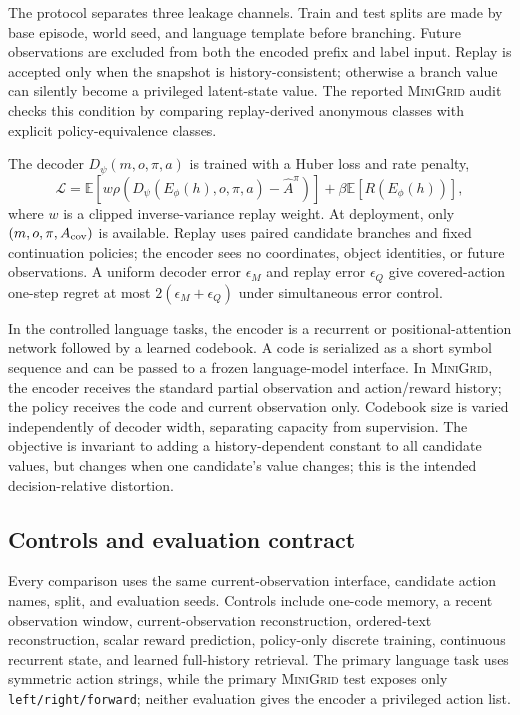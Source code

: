 \documentclass{article}
\def\minigrid{\textsc{MiniGrid}}
\begin{document}
The protocol separates three leakage channels. Train and test splits are made by base episode, world seed, and language template before branching. Future observations are excluded from both the encoded prefix and label input. Replay is accepted only when the snapshot is history-consistent; otherwise a branch value can silently become a privileged latent-state value. The reported \minigrid{} audit checks this condition by comparing replay-derived anonymous classes with explicit policy-equivalence classes.

The decoder $D_\psi(m,o,\pi,a)$ is trained with a Huber loss and rate penalty,
\begin{equation}
\mathcal L=\mathbb E\left[w\rho(D_\psi(E_\phi(h),o,\pi,a)-\widehat A^\pi)\right]+\beta\mathbb E[R(E_\phi(h))],
\end{equation}
where $w$ is a clipped inverse-variance replay weight. At deployment, only $(m,o,\pi,A_{\rm cov})$ is available. Replay uses paired candidate branches and fixed continuation policies; the encoder sees no coordinates, object identities, or future observations. A uniform decoder error $\epsilon_M$ and replay error $\epsilon_Q$ give covered-action one-step regret at most $2(\epsilon_M+\epsilon_Q)$ under simultaneous error control.

In the controlled language tasks, the encoder is a recurrent or positional-attention network followed by a learned codebook. A code is serialized as a short symbol sequence and can be passed to a frozen language-model interface. In \minigrid{}, the encoder receives the standard partial observation and action/reward history; the policy receives the code and current observation only. Codebook size is varied independently of decoder width, separating capacity from supervision. The objective is invariant to adding a history-dependent constant to all candidate values, but changes when one candidate's value changes; this is the intended decision-relative distortion.

\subsection{Controls and evaluation contract}
Every comparison uses the same current-observation interface, candidate action names, split, and evaluation seeds. Controls include one-code memory, a recent observation window, current-observation reconstruction, ordered-text reconstruction, scalar reward prediction, policy-only discrete training, continuous recurrent state, and learned full-history retrieval. The primary language task uses symmetric action strings, while the primary \minigrid{} test exposes only \texttt{left/right/forward}; neither evaluation gives the encoder a privileged action list.
\end{document}
